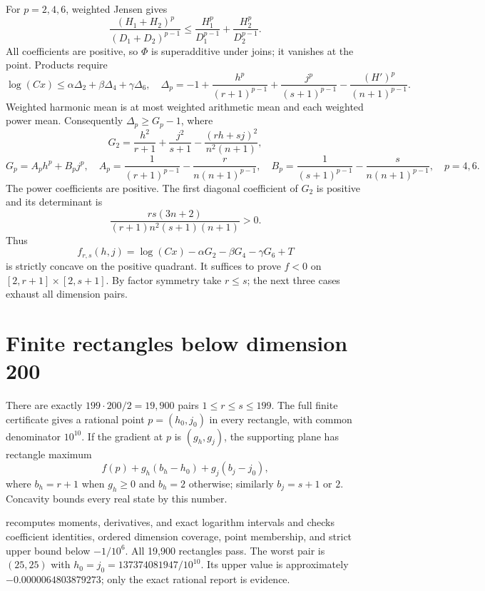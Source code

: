 \documentclass[11pt]{article}
\newcommand{\code}[1]{\texttt{\detokenize{#1}}}
\begin{document}
For $p=2,4,6$, weighted Jensen gives
\[
 \frac{(H_1+H_2)^p}{(D_1+D_2)^{p-1}}
 \le\frac{H_1^p}{D_1^{p-1}}+\frac{H_2^p}{D_2^{p-1}}.
\]
All coefficients are positive, so $\Phi$ is superadditive under joins; it vanishes at the point. Products require
\[
 \log(Cx)\le\alpha\Delta_2+\beta\Delta_4+\gamma\Delta_6,
\quad \Delta_p=-1+\frac{h^p}{(r+1)^{p-1}}+\frac{j^p}{(s+1)^{p-1}}
                  -\frac{(H')^p}{(n+1)^{p-1}}.
\]
Weighted harmonic mean is at most weighted arithmetic mean and each weighted power mean. Consequently $\Delta_p\ge G_p-1$, where
\[
 G_2=\frac{h^2}{r+1}+\frac{j^2}{s+1}-\frac{(rh+sj)^2}{n^2(n+1)},
\]
\[
 G_p=A_p h^p+B_pj^p,\quad
 A_p=\frac1{(r+1)^{p-1}}-\frac r{n(n+1)^{p-1}},\quad
 B_p=\frac1{(s+1)^{p-1}}-\frac s{n(n+1)^{p-1}},\quad p=4,6.
\]
The power coefficients are positive. The first diagonal coefficient of $G_2$ is positive and its determinant is
\[
 \frac{rs(3n+2)}{(r+1)n^2(s+1)(n+1)}>0.
\]
Thus
\[
 f_{r,s}(h,j)=\log(Cx)-\alpha G_2-\beta G_4-\gamma G_6+T
\]
is strictly concave on the positive quadrant. It suffices to prove $f<0$ on $[2,r+1]\times[2,s+1]$. By factor symmetry take $r\le s$; the next three cases exhaust all dimension pairs.

\section{Finite rectangles below dimension 200}
There are exactly $199\cdot200/2=19,900$ pairs $1\le r\le s\le199$. The full finite certificate gives a rational point $p=(h_0,j_0)$ in every rectangle, with common denominator $10^{10}$. If the gradient at $p$ is $(g_h,g_j)$, the supporting plane has rectangle maximum
\[
 f(p)+g_h(b_h-h_0)+g_j(b_j-j_0),
\]
where $b_h=r+1$ when $g_h\ge0$ and $b_h=2$ otherwise; similarly $b_j=s+1$ or $2$. Concavity bounds every real state by this number.

\code{check_sextic_finite.py} recomputes moments, derivatives, and exact logarithm intervals and checks coefficient identities, ordered dimension coverage, point membership, and strict upper bound below $-1/10^6$. All 19,900 rectangles pass. The worst pair is $(25,25)$ with $h_0=j_0=137374081947/10^{10}$. Its upper value is approximately $-0.0000064803879273$; only the exact rational report is evidence.
\end{document}
